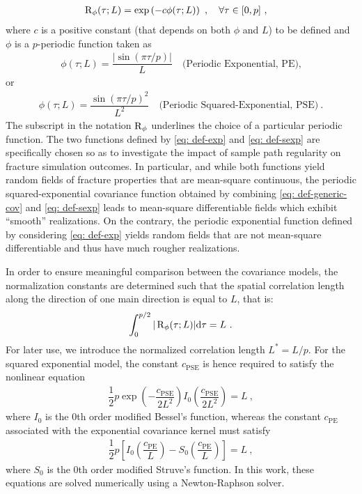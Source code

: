 \begin{align}
  \operatorname{R}_\phi(\tau; L) & = \exp\left( -c \phi(\tau; L)\right )~, \quad \forall \tau \in [0,p]~, \label{eq: def-generic-cov} 
\end{align}
where $c$ is a positive constant (that depends on both $\phi$ and $L$) to be defined and $\phi$ is a $p$-periodic function taken as
\begin{align}
  \phi(\tau; L) = \dfrac{|\sin\left( \pi\tau/p \right)|}{L} \quad \text{(Periodic Exponential, PE),} \label{eq: def-exp}
\end{align}
or
\begin{align}
  \phi(\tau; L) = \dfrac{\sin\left( \pi\tau/p \right)^2}{L^2} \quad \text{(Periodic Squared-Exponential, PSE)}~. \label{eq: def-sexp}
\end{align}
The subscript in the notation $\operatorname{R}_\phi$ underlines the choice of a particular periodic function. The two functions defined by \eqref{eq: def-exp} and \eqref{eq: def-sexp} are specifically chosen so as to investigate the impact of sample path regularity on fracture simulation outcomes. In particular, and while both functions yield random fields of fracture properties that are mean-square continuous, the periodic squared-exponential covariance function obtained by combining \eqref{eq: def-generic-cov} and \eqref{eq: def-sexp} leads to mean-square differentiable fields which exhibit ``smooth'' realizations. On the contrary, the periodic exponential function defined by considering \eqref{eq: def-exp} yields random fields that are not mean-square differentiable and thus have much rougher realizations.

In order to ensure meaningful comparison between the covariance models, the normalization constants are determined such that the spatial correlation length along the direction of one main direction is equal to $L$, that is:
\begin{align}
  \int_0^{p/2} |\operatorname{R}_\phi(\tau; L)| \mathrm{d}\tau = L~.
\end{align}
For later use, we introduce the normalized correlation length $L^* = L/p$. For the squared exponential model, the constant $c^{}_\text{PSE}$ is hence required to satisfy the nonlinear equation
\begin{align}
  \dfrac{1}{2}p\exp\left( -\dfrac{c^{}_\text{PSE}}{2L^2} \right)I_0(\dfrac{c^{}_\text{PSE}}{2L^2}) = L~, \label{eq: pse normalization}
\end{align}
where $I_0$ is the 0th order modified Bessel's function, whereas the constant $c^{}_\text{PE}$ associated with the exponential covariance kernel must satisfy
\begin{align}
  \dfrac{1}{2}p\left[ I_0\left(\dfrac{c^{}_\text{PE}}{L}\right) - S_0\left(\dfrac{c^{}_\text{PE}}{L}\right) \right] = L~, \label{eq: se normalization}
\end{align}
where $S_0$ is the 0th order modified Struve's function.
In this work, these equations are solved numerically using a Newton-Raphson solver.

